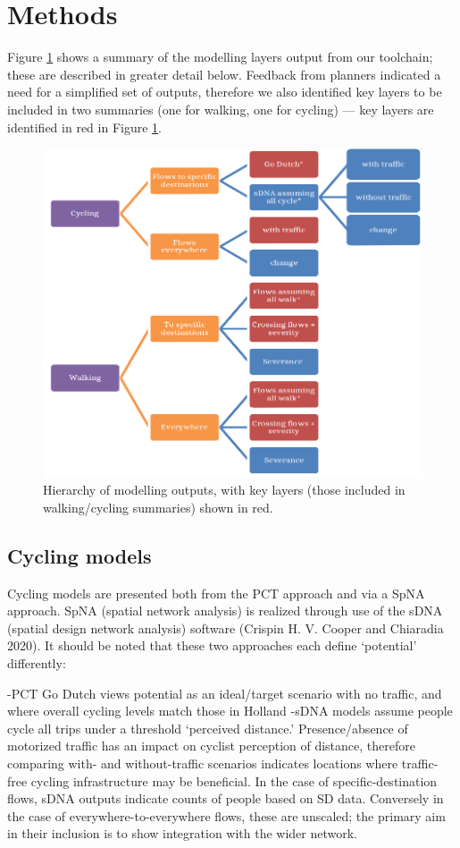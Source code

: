 \documentclass[galley]{jtlu-article-2col}
\begin{document}
\hypertarget{methods}{%
\section{Methods}\label{methods}}

Figure \ref{fig:flowchart} shows a summary of the modelling layers output from our toolchain; these are described in greater detail below.
Feedback from planners indicated a need for a simplified set of outputs, therefore we also identified key layers to be included in two summaries (one for walking, one for cycling) --- key layers are identified in red in Figure \ref{fig:flowchart}.

\begin{figure}

{\centering \includegraphics[width=0.6\linewidth]{figures/flowchart} 

}

\caption{Hierarchy of modelling outputs, with key layers (those included in walking/cycling summaries) shown in red.}\label{fig:flowchart}
\end{figure}

\hypertarget{cycling-models}{%
\subsection{Cycling models}\label{cycling-models}}

Cycling models are presented both from the PCT approach and via a SpNA approach. SpNA (spatial network analysis) is realized through use of the sDNA (spatial design network analysis) software (Crispin H. V. Cooper and Chiaradia 2020).
It should be noted that these two approaches each define `potential' differently:

-PCT Go Dutch views potential as an ideal/target scenario with no traffic, and where overall cycling levels match those in Holland
-sDNA models assume people cycle all trips under a threshold `perceived distance.' Presence/absence of motorized traffic has an impact on cyclist perception of distance, therefore comparing with- and without-traffic scenarios indicates locations where traffic-free cycling infrastructure may be beneficial. In the case of specific-destination flows, sDNA outputs indicate counts of people based on SD data. Conversely in the case of everywhere-to-everywhere flows, these are unscaled; the primary aim in their inclusion is to show integration with the wider network.
\end{document}
